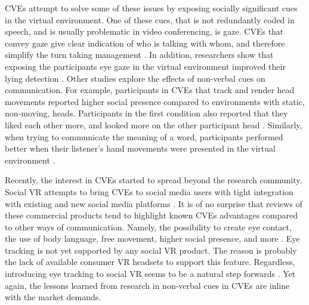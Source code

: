 \documentclass[]{simple-thesis}
\begin{document}
CVEs attempt to solve some of these issues by exposing socially significant cues in the virtual environment.
One of these cues, that is not redundantly coded in speech, and is usually problematic in video conferencing, is gaze.
CVEs that convey gaze give clear indication of who is talking with whom, and therefore simplify the turn taking management \citep{Vertegaal1999, Vertegaal2003}.
In addition, researchers show that exposing the participants eye gaze in the virtual environment improved their lying detection \citep{Steptoe2010}.
Other studies explore the effects of non-verbal cues on communication.
For example, participants in CVEs that track and render head movements reported higher social presence compared to environments with static, non-moving, heads.
Participants in the first condition also reported that they liked each other more, and looked more on the other participant head \citep{Bailenson2002}.
Similarly, when trying to communicate the meaning of a word, participants performed better when their listener's hand movements were presented in the virtual environment \citep{Dodds2011}.

Recently, the interest in CVEs started to spread beyond the research community.
Social VR attempts to bring CVEs to social media users with tight integration with existing and new social media platforms \citep{Bonasio2016}.
It is of no surprise that reviews of these commercial products tend to highlight known CVEs advantages compared to other ways of communication.
Namely, the possibility to create eye contact, the use of body language, free movement, higher social presence, and more \citep{Rosedale2015}.
Eye tracking is not yet supported by any social VR product.
The reason is probably the lack of available consumer VR headsets to support this feature.
Regardless, introducing eye tracking to social VR seems to be a natural step forwards \citep{Langley2017}.
Yet again, the lessons learned from research in non-verbal cues in CVEs are inline with the market demands.
\end{document}

